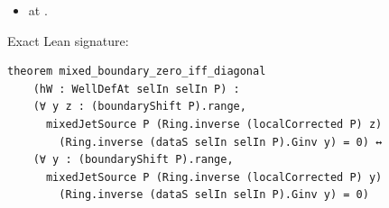 \begin{theorem}[bp-024]
\begin{itemize}
\item \texttt{} at \texttt{}.
\end{itemize}
\par Exact Lean signature:
\begin{verbatim}
theorem mixed_boundary_zero_iff_diagonal
    (hW : WellDefAt selIn selIn P) :
    (∀ y z : (boundaryShift P).range,
      mixedJetSource P (Ring.inverse (localCorrected P) z)
        (Ring.inverse (dataS selIn selIn P).Ginv y) = 0) ↔
    (∀ y : (boundaryShift P).range,
      mixedJetSource P (Ring.inverse (localCorrected P) y)
        (Ring.inverse (dataS selIn selIn P).Ginv y) = 0)
\end{verbatim}
\end{theorem}

